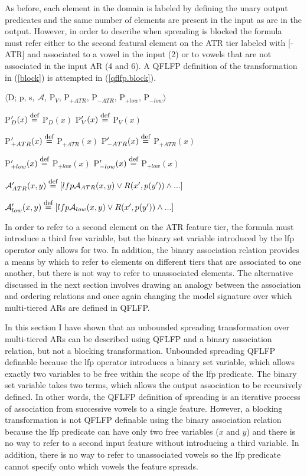 \documentclass[,doc,floatsintext]{apa6}
\def\defeq{\mathrel{\buildrel \mbox{\footnotesize def} \over =}}
\theoremstyle{definition}
\theoremstyle{definition}
\theoremstyle{definition}
\theoremstyle{remark}
\begin{document}
As before, each element in the domain is labeled by defining the unary
output predicates and the same number of elements are present in the
input as are in the output. However, in order to describe when spreading
is blocked the formula must refer either to the second featural element
on the ATR tier labeled with {[}-ATR{]} and associated to a vowel in the
input (2) or to vowels that are not associated in the input AR (4 and
6). A QFLFP definition of the transformation in (\ref{block}) is
attempted in (\ref{qflfp.block}).

\begin{exe}
\ex\label{qflfp.block} $\langle$D; p, s, $\mathcal{A}$, P$_V$, P$_{+ATR}$, P$_{-ATR}$, P$_{+low}$, P$_{-low}\rangle$ 
\end{exe}

P\('_{D}(x) \defeq\) P\(_{D}(x)\) \hspace{1.07in} P\('_{V}(x) \defeq\)
P\(_{V}(x)\)

P\('_{+ATR}(x) \defeq\) P\(_{+ATR}(x)\) \hspace{0.65in}
P\('_{-ATR}(x) \defeq\) P\(_{+ATR}(x)\)

P\('_{+low}(x) \defeq\) P\(_{+low}(x)\) \hspace{0.75in}
P\('_{-low}(x) \defeq\) P\(_{+low}(x)\)

\(\mathcal{A}_{ATR}'(x, y) \defeq [lfp \mathcal{A}_{ATR}(x, y)\vee R(x', p(y'))\wedge ...]\)

\(\mathcal{A}_{low}'(x, y) \defeq [lfp \mathcal{A}_{low}(x, y)\vee R(x', p(y'))\wedge ...]\)
\vspace{0.25in}

\noindent In order to refer to a second element on the ATR feature tier,
the formula must introduce a third free variable, but the binary set
variable introduced by the lfp operator only allows for two. In
addition, the binary association relation provides a means by which to
refer to elements on different tiers that are associated to one another,
but there is not way to refer to unassociated elements. The alternative
discussed in the next section involves drawing an analogy between the
association and ordering relations and once again changing the model
signature over which multi-tiered ARs are defined in QFLFP.

In this section I have shown that an unbounded spreading transformation
over multi-tiered ARs can be described using QFLFP and a binary
association relation, but not a blocking transformation. Unbounded
spreading QFLFP definable because the lfp operator introduces a binary
set variable, which allows exactly two variables to be free within the
scope of the lfp predicate. The binary set variable takes two terms,
which allows the output association to be recursively defined. In other
words, the QFLFP definition of spreading is an iterative process of
association from successive vowels to a single feature. However, a
blocking transformation is not QFLFP definable using the binary
association relation because the lfp predicate can have only two free
variables (\(x\) and \(y\)) and there is no way to refer to a second
input feature without introducing a third variable. In addition, there
is no way to refer to unassociated vowels so the lfp predicate cannot
specify onto which vowels the feature spreads.
\end{document}
